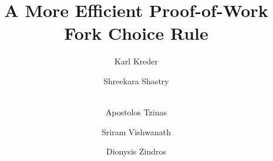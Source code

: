 \title{A More Efficient Proof-of-Work Fork Choice Rule}
\ifanonymous{\iflncs
\author{}\institute{}
\fi}
\else
\author{
        Karl Kreder \and
        Shreekara Shastry \and\\
        Apostolos Tzinas \and
        Sriram Vishwanath \and
        Dionysis Zindros
}
